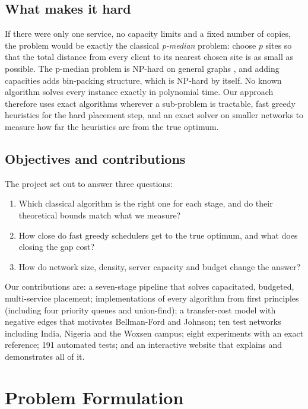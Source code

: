\subsection{What makes it hard}
If there were only one service, no capacity limits and a fixed number of copies, the problem would be exactly the classical \emph{p-median} problem: choose $p$ sites so that the total distance from every client to its nearest chosen site is as small as possible. The p-median problem is NP-hard on general graphs \cite{kariv1979}, and adding capacities adds bin-packing structure, which is NP-hard by itself. No known algorithm solves every instance exactly in polynomial time. Our approach therefore uses exact algorithms wherever a sub-problem is tractable, fast greedy heuristics for the hard placement step, and an exact solver on smaller networks to measure how far the heuristics are from the true optimum.

\subsection{Objectives and contributions}
The project set out to answer three questions:
\begin{enumerate}[label=\textbf{Q\arabic*},leftmargin=*]
  \item Which classical algorithm is the right one for each stage, and do their theoretical bounds match what we measure?
  \item How close do fast greedy schedulers get to the true optimum, and what does closing the gap cost?
  \item How do network size, density, server capacity and budget change the answer?
\end{enumerate}
Our contributions are: a seven-stage pipeline that solves capacitated, budgeted, multi-service placement; implementations of every algorithm from first principles (including four priority queues and union-find); a transfer-cost model with negative edges that motivates Bellman-Ford and Johnson; ten test networks including India, Nigeria and the Woxsen campus; eight experiments with an exact reference; 191 automated tests; and an interactive website that explains and demonstrates all of it.

\section{Problem Formulation}\label{sec:model}

